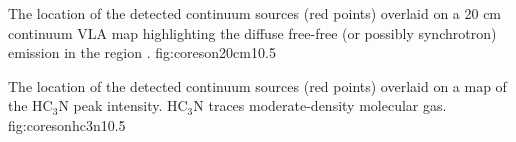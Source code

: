 \documentclass{emulateapj}
\begin{document}

% 
% 


{The location of the detected continuum sources (red points) overlaid on a 20
cm continuum VLA map highlighting the diffuse free-free (or possibly
synchrotron) emission in the region \citep{Yusef-Zadeh2004a}.}
{fig:coreson20cm}{1}{0.5\textwidth}

{The location of the detected continuum sources (red points) overlaid on a map
of the HC$_3$N peak intensity.  HC$_3$N traces moderate-density molecular gas.}
{fig:coresonhc3n}{1}{0.5\textwidth}
\end{document}
